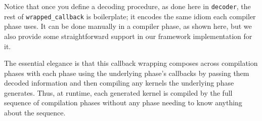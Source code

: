 Notice that once you define a decoding procedure, as done here in \texttt{decoder}, the rest of \texttt{wrapped\_callback} is boilerplate; it encodes the same idiom each compiler phase uses. It can be done manually in a compiler phase, as shown here, but we also provide some straightforward support in our framework implementation for it.

The essential elegance is that this callback wrapping composes across compilation phases with each phase using the underlying phase's callbacks by passing them decoded information and then compiling any kernels the underlying phase generates. Thus, at runtime, each generated kernel is compiled by the full sequence of compilation phases without any phase needing to know anything about the sequence.







    
